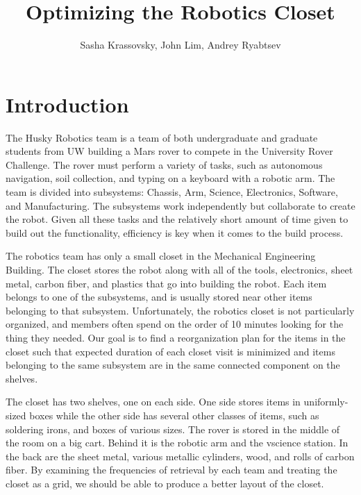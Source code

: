 \documentclass[10pt]{article}
\title{Optimizing the Robotics Closet}
\author{Sasha Krassovsky, John Lim, Andrey Ryabtsev}
\theoremstyle{named}
\begin{document}
\maketitle
\pagebreak

\section{Introduction}
The Husky Robotics team is a team of both undergraduate and graduate students
from UW building a Mars rover to compete in the University Rover Challenge.
The rover must perform a variety of tasks, such as autonomous navigation, soil
collection, and typing on a keyboard with a robotic arm. The team is divided
into subsystems: Chassis, Arm, Science, Electronics, Software, and Manufacturing.
The subsystems work independently but collaborate to create the robot. Given
all these tasks and the relatively short amount of time given to build out the
functionality, efficiency is key when it comes to the build process.
\par
The robotics team has only a small closet in the Mechanical Engineering Building.
The closet stores the robot along with all of the tools, electronics, sheet metal,
carbon fiber, and plastics that go into building the robot. Each item belongs to
one of the subsystems, and is usually stored near other items belonging to that
subsystem. Unfortunately, the robotics closet is not particularly organized, and
members often spend on the order of 10 minutes looking for the thing they needed.
Our goal is to find a reorganization plan for the items in the closet such that
expected duration of each closet visit is minimized and items belonging to the
same subsystem are in the same connected component on the shelves.
\par
The closet has two shelves, one on each side. One side stores items in
uniformly-sized boxes while the other side has several other classes of items,
such as soldering irons, and boxes of various sizes. The rover is stored in
the middle of the room on a big cart. Behind it is the robotic arm and the
vscience station. In the back are the sheet metal, various metallic cylinders,
wood, and rolls of carbon fiber. By examining the frequencies of retrieval
by each team and treating the closet as a grid, we should be able to produce
a better layout of the closet.
\end{document}
